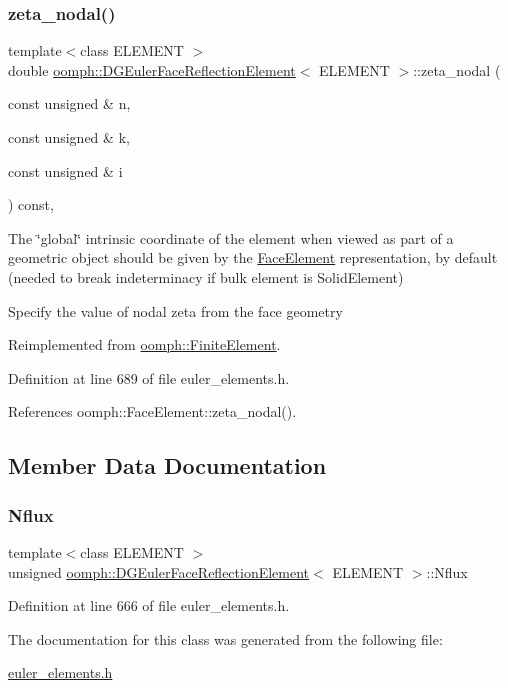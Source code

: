 \subsubsection{\texorpdfstring{zeta\+\_\+nodal()}{zeta\_nodal()}}
{\footnotesize\ttfamily template$<$class E\+L\+E\+M\+E\+NT $>$ \\
double \hyperlink{classoomph_1_1DGEulerFaceReflectionElement}{oomph\+::\+D\+G\+Euler\+Face\+Reflection\+Element}$<$ E\+L\+E\+M\+E\+NT $>$\+::zeta\+\_\+nodal (\begin{DoxyParamCaption}\item[{const unsigned \&}]{n,  }\item[{const unsigned \&}]{k,  }\item[{const unsigned \&}]{i }\end{DoxyParamCaption}) const\hspace{0.3cm}{\ttfamily [inline]}, {\ttfamily [virtual]}}



The \char`\"{}global\char`\"{} intrinsic coordinate of the element when viewed as part of a geometric object should be given by the \hyperlink{classoomph_1_1FaceElement}{Face\+Element} representation, by default (needed to break indeterminacy if bulk element is Solid\+Element) 

Specify the value of nodal zeta from the face geometry 

Reimplemented from \hyperlink{classoomph_1_1FiniteElement_a849561c5fbcbc07dc49d2dc6cca68559}{oomph\+::\+Finite\+Element}.



Definition at line 689 of file euler\+\_\+elements.\+h.



References oomph\+::\+Face\+Element\+::zeta\+\_\+nodal().



\subsection{Member Data Documentation}
\mbox{\label{classoomph_1_1DGEulerFaceReflectionElement_afdb06b622f23a5ccea9173283d68df2f}} 
\subsubsection{\texorpdfstring{Nflux}{Nflux}}
{\footnotesize\ttfamily template$<$class E\+L\+E\+M\+E\+NT $>$ \\
unsigned \hyperlink{classoomph_1_1DGEulerFaceReflectionElement}{oomph\+::\+D\+G\+Euler\+Face\+Reflection\+Element}$<$ E\+L\+E\+M\+E\+NT $>$\+::Nflux\hspace{0.3cm}{\ttfamily [private]}}



Definition at line 666 of file euler\+\_\+elements.\+h.



The documentation for this class was generated from the following file\+:\begin{DoxyCompactItemize}
\item 
\hyperlink{euler__elements_8h}{euler\+\_\+elements.\+h}\end{DoxyCompactItemize}
